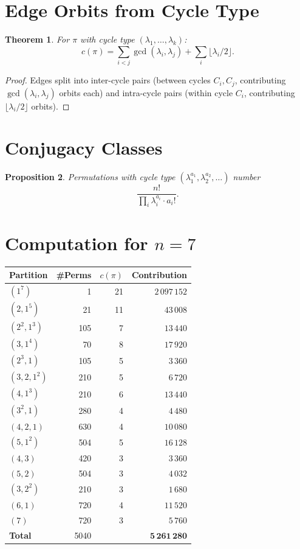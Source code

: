 \documentclass[11pt]{article}
\newtheorem{theorem}{Theorem}
\newtheorem{proposition}[theorem]{Proposition}
\theoremstyle{definition}
\begin{document}
\section{Edge Orbits from Cycle Type}

\begin{theorem}
For $\pi$ with cycle type $(\lambda_1, \ldots, \lambda_k)$:
\[
c(\pi) = \sum_{i<j}\gcd(\lambda_i, \lambda_j) + \sum_{i}\lfloor \lambda_i/2 \rfloor.
\]
\end{theorem}

\begin{proof}
Edges split into inter-cycle pairs (between cycles $C_i, C_j$, contributing $\gcd(\lambda_i, \lambda_j)$ orbits each) and intra-cycle pairs (within cycle $C_i$, contributing $\lfloor \lambda_i/2 \rfloor$ orbits).
\end{proof}

\section{Conjugacy Classes}

\begin{proposition}
Permutations with cycle type $(\lambda_1^{a_1}, \lambda_2^{a_2}, \ldots)$ number
\[
\frac{n!}{\prod_i \lambda_i^{a_i} \cdot a_i!}.
\]
\end{proposition}

\section{Computation for $n=7$}

\begin{center}
\begin{tabular}{lrrr}
\toprule
Partition & \#Perms & $c(\pi)$ & Contribution \\
\midrule
$(1^7)$ & 1 & 21 & $2\,097\,152$ \\
$(2,1^5)$ & 21 & 11 & $43\,008$ \\
$(2^2,1^3)$ & 105 & 7 & $13\,440$ \\
$(3,1^4)$ & 70 & 8 & $17\,920$ \\
$(2^3,1)$ & 105 & 5 & $3\,360$ \\
$(3,2,1^2)$ & 210 & 5 & $6\,720$ \\
$(4,1^3)$ & 210 & 6 & $13\,440$ \\
$(3^2,1)$ & 280 & 4 & $4\,480$ \\
$(4,2,1)$ & 630 & 4 & $10\,080$ \\
$(5,1^2)$ & 504 & 5 & $16\,128$ \\
$(4,3)$ & 420 & 3 & $3\,360$ \\
$(5,2)$ & 504 & 3 & $4\,032$ \\
$(3,2^2)$ & 210 & 3 & $1\,680$ \\
$(6,1)$ & 720 & 4 & $11\,520$ \\
$(7)$ & 720 & 3 & $5\,760$ \\
\midrule
\textbf{Total} & 5040 & & $\mathbf{5\,261\,280}$ \\
\bottomrule
\end{tabular}
\end{center}
\end{document}
